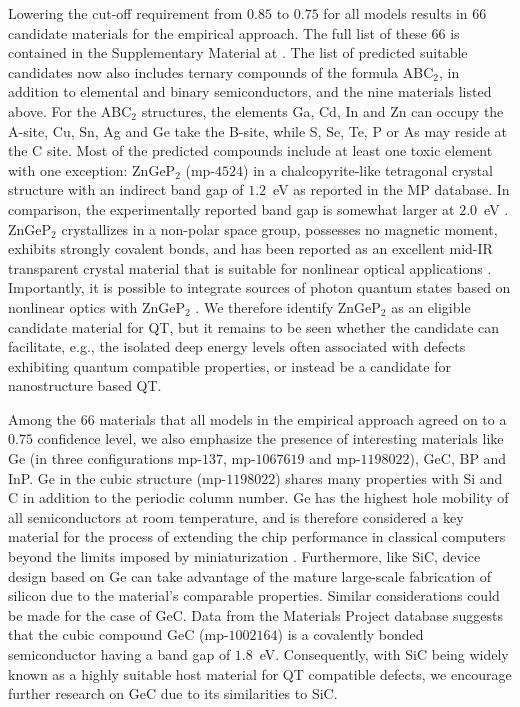 \documentclass[superscriptaddress,unsortedaddress,
 amsmath,amssymb,
 aps,
]{revtex4-2}
\begin{document}
Lowering the cut-off requirement from $0.85$ to $0.75$ for all models results in $66$ candidate materials for the empirical approach.  
The full list of these $66$ is contained in the Supplementary Material at \cite{supplementary}. 
The list of predicted suitable candidates now also includes ternary compounds of the formula ABC$_2$, in addition to elemental and binary semiconductors, and the nine materials listed above. For the ABC$_2$ structures, the elements Ga, Cd, In and Zn can occupy the A-site, Cu, Sn, Ag and Ge take the B-site, while S, Se, Te, P or As may reside at the C site. Most of the predicted compounds include at least one toxic element with one exception: ZnGeP$_2$ (mp-$4524$) in a chalcopyrite-like tetragonal crystal structure with an indirect band gap of $1.2$~eV \cite{Zhang2015} as reported in the MP database. In comparison, the experimentally reported band gap is somewhat larger at $2.0$~eV \cite{Xing1989}. 
ZnGeP$_2$ crystallizes in a non-polar space group, possesses no magnetic moment, exhibits strongly covalent bonds, and has been reported as an excellent mid-IR transparent crystal material that is suitable for nonlinear optical applications \cite{Zhang2015}. Importantly, it is possible to integrate sources of photon quantum states based on nonlinear optics with ZnGeP$_2$ \cite{Caspani2017}. 
We therefore identify ZnGeP$_2$ as an eligible candidate material for QT, but it remains to be seen whether the candidate can facilitate, e.g., the isolated deep energy levels often associated with defects exhibiting quantum compatible properties, or instead be a candidate for nanostructure based QT.  

Among the $66$ materials that all models in the empirical approach agreed on to a $0.75$ confidence level, we also emphasize the presence of interesting materials like Ge (in three configurations mp-$137$, mp-$1067619$ and mp-$1198022$), GeC, BP and InP. Ge in the cubic structure (mp-$1198022$) shares many properties with Si and C in addition to the periodic column number. 
Ge has the highest hole mobility of all semiconductors at room temperature, and is therefore considered a key material for the process of extending the chip performance in classical computers beyond the limits imposed by miniaturization \cite{Scappucci2020}. Furthermore, like SiC, device design based on Ge can take advantage of the mature large-scale fabrication of silicon due to the material's comparable properties.  
%
Similar considerations could be made for the case of GeC. 
Data from the Materials Project database suggests that the cubic compound GeC (mp-$1002164$) is a covalently bonded semiconductor having a band gap of $1.8$~eV. 
Consequently, with SiC being widely known as a highly suitable host material for QT compatible defects, we encourage further research on GeC due to its similarities to SiC. 
\end{document}
